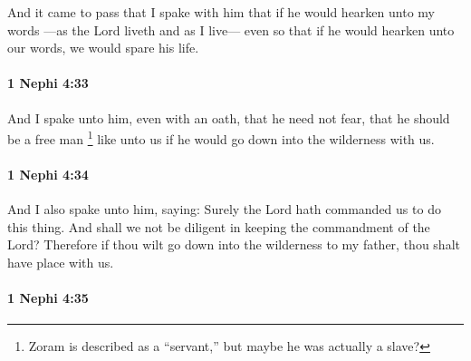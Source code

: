 			And it came to pass that I spake with him
			that if he would hearken unto my words
			---as the Lord liveth and as I live---
			even so that if he would hearken unto our words, we would spare his life.

		\paragraph{1 Nephi 4:33} %
			\label{1NEPHI-4-33}

			And I spake unto him, even with an oath, that he need not fear,
			that he should be a free man%
				\footnote{%
					\label{1NEPHI-4-33-NOTE-free}%
					Zoram is described as a ``servant,'' but maybe he was actually a slave?
					}
			like unto us
			if he would go down into the wilderness with us.

		\paragraph{1 Nephi 4:34} %
			\label{1NEPHI-4-34}

			And I also spake unto him, saying:
			Surely the Lord hath commanded us to do this thing.
			And shall we not be diligent in keeping the commandment of the Lord?
			Therefore if thou wilt go down into the wilderness to my father,
			thou shalt have place with us.

		\paragraph{1 Nephi 4:35} %
			\label{1NEPHI-4-35}

